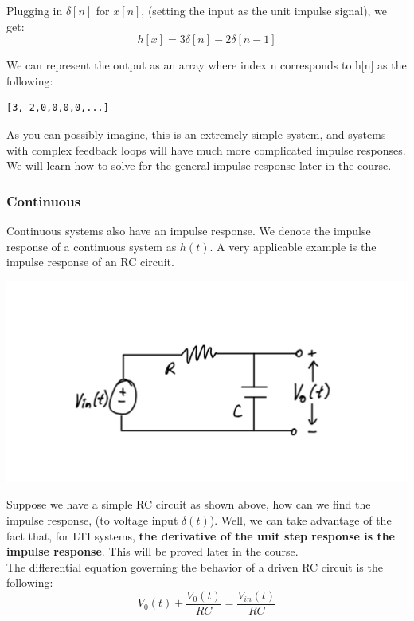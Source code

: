 \documentclass[a4paper]{article}
\numberwithin{equation}{section}
\begin{document}
Plugging in $\delta[n]$ for $x[n]$, (setting the input as the unit impulse signal), we get:
\begin{equation}
h[x]=3\delta[n]-2\delta[n-1]
\end{equation}

We can represent the output as an array where index n corresponds to h[n] as the following:
\begin{verbatim}
[3,-2,0,0,0,0,...]
\end{verbatim}
As you can possibly imagine, this is an extremely simple system, and systems with complex feedback loops will have much more complicated impulse responses. We will learn how to solve for the general impulse response later in the course.  \\
\smallskip
\subsubsection{Continuous}
Continuous systems also have an impulse response. We denote the impulse response of a continuous system as $h(t)$. A very applicable example is the impulse response of an RC circuit. 
\begin{center}
\includegraphics[scale=0.5]{RC.png}
\end{center}

Suppose we have a simple RC circuit as shown above, how can we find the impulse response, (to voltage input $\delta(t)$). Well, we can take advantage of the fact that, for LTI systems, \textbf{the derivative of the unit step response is the impulse response}. This will be proved later in the course.\\
\bigskip
The differential equation governing the behavior of a driven RC circuit is the following: 
\begin{equation}
\dot{V}_0(t)+\frac{V_0(t)}{RC}=\frac{V_{in}(t)}{RC}
\end{equation}
\end{document}
